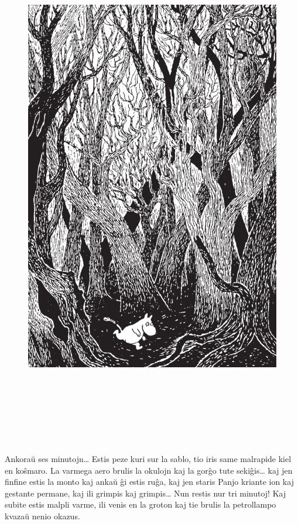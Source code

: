\begin{figure}[htbp]
\centering
\includegraphics[width=450pt,height=658pt]{9-10.png}
\caption{}
\label{9-10}
\end{figure}

Ankoraŭ ses minutojn{\ldots} Estis peze kuri sur la sablo, tio iris same malrapide kiel en koŝmaro. La varmega aero brulis la okulojn kaj la gorĝo tute sekiĝis{\ldots} kaj jen finfine estis la monto kaj ankaŭ ĝi estis ruĝa, kaj jen staris Panjo kriante ion kaj gestante permane, kaj ili grimpis kaj grimpis{\ldots} Nun restis nur tri minutoj! Kaj subite estis malpli varme, ili venis en la groton kaj tie brulis la petrollampo kvazaŭ nenio okazus.

